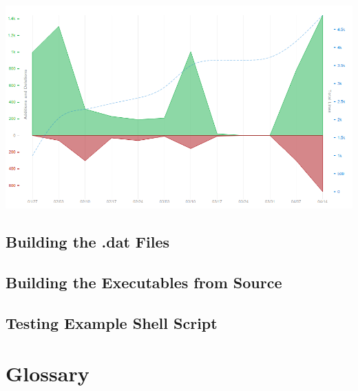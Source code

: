 \documentclass[11pt]{article} %
\begin{document}
\includegraphics[scale=0.35]{git3}
\pagebreak
\subsection{Building the .dat Files}

\pagebreak
\subsection{Building the Executables from Source}

\pagebreak
\subsection{Testing Example Shell Script}

\pagebreak
\section{Glossary}
\glsaddall
\printglossaries
\end{document}
